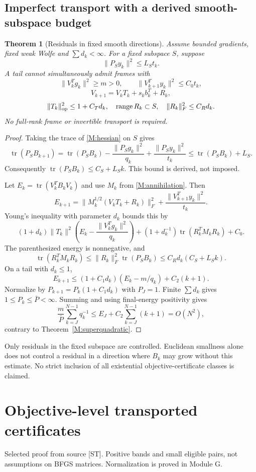 \documentclass[10pt,oneside,openany]{book}
\newcommand{\ModuleTag}{I}
\newtheorem{theorem}{Theorem}[chapter]
\theoremstyle{remark}\newtheorem{remark}{Remark}[chapter]
\newcommand{\StartModule}[3]{\cleardoublepage\renewcommand{\ModuleTag}{#1}\chapter{#2}\label{#1:chapter}\begin{small}\color{Accent}#3\end{small}\par\vspace{3pt}{\color{RuleGray}\hrule}\vspace{9pt}}
\begin{document}
\section{Imperfect transport with a derived smooth-subspace budget}
\label{M:residual}
\begin{theorem}[Residuals in fixed smooth directions]\label{M:residualtheorem}
Assume bounded gradients, fixed weak Wolfe and $\sum d_k<\infty$. For a fixed subspace $S$, suppose
\[
 \|P_Sy_k\|^2\le L_St_k.
\]
A tail cannot simultaneously admit frames with
\[
 \|V_k^Tg_k\|^2\ge m>0,\qquad\|V_{k+1}^Ty_k\|^2\le C_0t_k,
\]
\[
 V_{k+1}=V_kT_k+s_kb_k^T+R_k,
\]
\[
 \|T_k\|_{\rm op}^2\le1+C_Td_k,\quad\operatorname{range}R_k\subset S,
 \quad\|R_k\|_F^2\le C_Rd_k.
\]
No full-rank frame or invertible transport is required.
\end{theorem}
\begin{proof}
Taking the trace of \eqref{M:hessian} on $S$ gives
\[
 \operatorname{tr}(P_SB_{k+1})
 =\operatorname{tr}(P_SB_k)-\frac{\|P_Sg_k\|^2}{q_k}
 +\frac{\|P_Sy_k\|^2}{t_k}
 \le\operatorname{tr}(P_SB_k)+L_S.
\]
Consequently $\operatorname{tr}(P_SB_k)\le C_S+L_Sk$. This bound is derived, not imposed.

Let $E_k=\operatorname{tr}(V_k^TB_kV_k)$ and use $M_k$ from \eqref{M:annihilation}. Then
\[
 E_{k+1}=\|M_k^{1/2}(V_kT_k+R_k)\|_F^2+\frac{\|V_{k+1}^Ty_k\|^2}{t_k}.
\]
Young's inequality with parameter $d_k$ bounds this by
\[
 (1+d_k)\|T_k\|^2\left(E_k-\frac{\|V_k^Tg_k\|^2}{q_k}\right)
 +(1+d_k^{-1})\operatorname{tr}(R_k^TM_kR_k)+C_0.
\]
The parenthesized energy is nonnegative, and
\[
 \operatorname{tr}(R_k^TM_kR_k)
 \le\|R_k\|_F^2\operatorname{tr}(P_SB_k)
 \le C_Rd_k(C_S+L_Sk).
\]
On a tail with $d_k\le1$,
\[
 E_{k+1}\le(1+C_1d_k)(E_k-m/q_k)+C_2(k+1).
\]
Normalize by $P_{k+1}=P_k(1+C_1d_k)$ with $P_J=1$. Finite $\sum d_k$ gives $1\le P_k\le\bar P<\infty$. Summing and using final-energy positivity gives
\[
 \frac m{\bar P}\sum_{k=J}^{N-1}q_k^{-1}
 \le E_J+C_2\sum_{k=J}^{N-1}(k+1)=O(N^2),
\]
contrary to Theorem~\ref{M:superquadratic}.
\end{proof}
Only residuals in the fixed subspace are controlled. Euclidean smallness alone does not control a residual in a direction where $B_k$ may grow without this estimate. No strict inclusion of all existential objective-certificate classes is claimed.


\StartModule{T}{Objective-level transported certificates}{Selected proof from source [ST]. Positive bands and small eligible pairs, not assumptions on BFGS matrices. Normalization is proved in Module G.}
\end{document}
